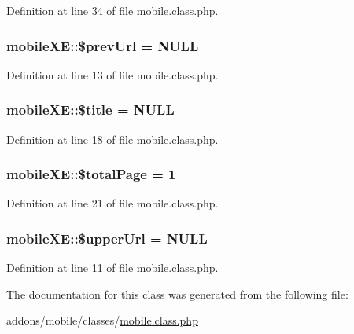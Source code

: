 Definition at line 34 of file mobile.\+class.\+php.

\hypertarget{classmobileXE_acbc08c3fe06a6a5aaae6cbdc8738559f}{}
\subsubsection[{\$prev\+Url}]{\setlength{\rightskip}{0pt plus 5cm}mobile\+X\+E\+::\$prev\+Url = N\+U\+L\+L}\label{classmobileXE_acbc08c3fe06a6a5aaae6cbdc8738559f}


Definition at line 13 of file mobile.\+class.\+php.

\hypertarget{classmobileXE_aeb2ef82029883fd60174e3d0e9f7dcc3}{}
\subsubsection[{\$title}]{\setlength{\rightskip}{0pt plus 5cm}mobile\+X\+E\+::\$title = N\+U\+L\+L}\label{classmobileXE_aeb2ef82029883fd60174e3d0e9f7dcc3}


Definition at line 18 of file mobile.\+class.\+php.

\hypertarget{classmobileXE_a0d7bcada3689f84f67337d02c8dd6f21}{}
\subsubsection[{\$total\+Page}]{\setlength{\rightskip}{0pt plus 5cm}mobile\+X\+E\+::\$total\+Page = 1}\label{classmobileXE_a0d7bcada3689f84f67337d02c8dd6f21}


Definition at line 21 of file mobile.\+class.\+php.

\hypertarget{classmobileXE_a643b9ca5393066afea26819e4f1cf115}{}
\subsubsection[{\$upper\+Url}]{\setlength{\rightskip}{0pt plus 5cm}mobile\+X\+E\+::\$upper\+Url = N\+U\+L\+L}\label{classmobileXE_a643b9ca5393066afea26819e4f1cf115}


Definition at line 11 of file mobile.\+class.\+php.



The documentation for this class was generated from the following file\+:\begin{DoxyCompactItemize}
\item 
addons/mobile/classes/\hyperlink{addons_2mobile_2classes_2mobile_8class_8php}{mobile.\+class.\+php}\end{DoxyCompactItemize}
